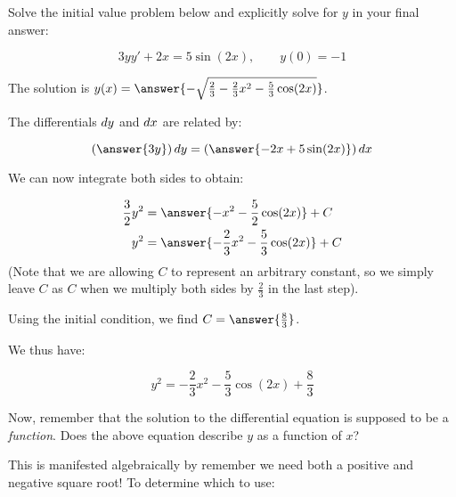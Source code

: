 \documentclass{ximera}
\author{Jim Talamo}
\begin{document}
\begin{exercise}
Solve the initial value problem below and explicitly solve for $y$ in your final answer:

\[
3y y' +2x = 5\sin(2x)  , \qquad y(0)=-1
\]

The solution is $y(x) = \answer{ - \sqrt{\frac{2}{3} -\frac{2}{3}x^2 -\frac{5}{3} \cos(2x)} }$.

\begin{hint}
The differentials $\mathop{}\!d y$ and $\mathop{}\!d x$ are related by:

\[
\left(\answer{3y} \right) \d y = \left(\answer{ -2x+5\sin(2x) } \right) \d x
\]

\begin{question}
We can now integrate both sides to obtain:

\begin{align*}
\frac{3}{2}y^2 &= \answer{-x^2-\frac{5}{2}\cos(2x)} +C\\
y^2 &= \answer{-\frac{2}{3}x^2 -\frac{5}{3}\cos(2x)}+C
\end{align*}
(Note that we are allowing $C$ to represent an arbitrary constant, so we simply leave $C$ as $C$ when we multiply both sides by $\frac{2}{3}$ in the last step).

Using the initial condition, we find $C=\answer{\frac{8}{3}}$.

\begin{question}

\end{question}
We thus have:

\[
y^2 = -\frac{2}{3}x^2 -\frac{5}{3}\cos(2x)+\frac{8}{3}
\]

Now, remember that the solution to the differential equation is supposed to be a \emph{function}.  Does the above equation describe $y$ as a function of $x$?

\begin{multipleChoice}
\end{multipleChoice}

This is manifested algebraically by remember we need both a positive and negative square root!  To determine which to use:

\begin{multipleChoice}
\end{multipleChoice}
\end{question}
 \end{hint}
 
\end{exercise}
\end{document}
